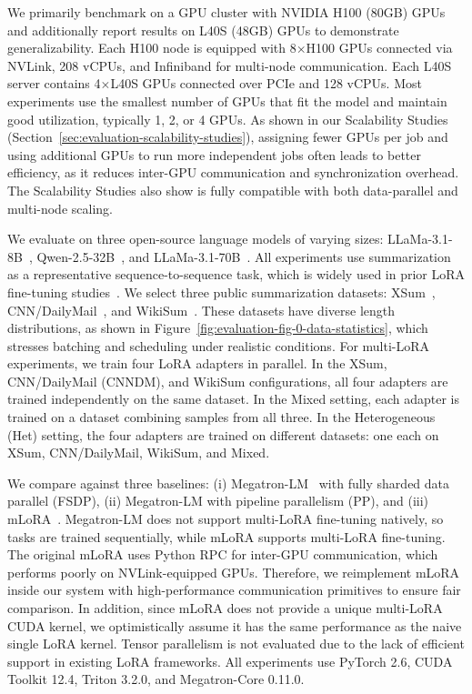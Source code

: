 We primarily benchmark \Name on a GPU cluster with NVIDIA H100 (80GB) GPUs and additionally report results on L40S (48GB) GPUs to demonstrate generalizability.
Each H100 node is equipped with 8$\times$H100 GPUs connected via NVLink, 208 vCPUs, and Infiniband for multi-node communication. 
Each L40S server contains 4$\times$L40S GPUs connected over PCIe and 128 vCPUs. 
Most experiments use the smallest number of GPUs that fit the model and maintain good utilization, typically 1, 2, or 4 GPUs. 
As shown in our Scalability Studies (Section~\ref{sec:evaluation-scalability-studies}), assigning fewer GPUs per job and using additional GPUs to run more independent jobs often leads to better efficiency, as it reduces inter-GPU communication and synchronization overhead.
The Scalability Studies also show \Name is fully compatible with both data-parallel and multi-node scaling.

We evaluate \Name on three open-source language models of varying sizes: LLaMa-3.1-8B~\cite{llama3.1}, Qwen-2.5-32B~\cite{yang2024qwen2-5}, and LLaMa-3.1-70B~\cite{llama3.1}. 
All experiments use summarization as a representative sequence-to-sequence task, which is widely used in prior LoRA fine-tuning studies~\cite{hu2022lora, li2023loftq, liu2024rst}.
We select three public summarization datasets: XSum~\cite{xsum-dataset}, CNN/DailyMail~\cite{cnn-dailymail-dataset}, and WikiSum~\cite{wikisum-dataset}. These datasets have diverse length distributions, as shown in Figure~\ref{fig:evaluation-fig-0-data-statistics}, which stresses batching and scheduling under realistic conditions.
For multi-LoRA experiments, we train four LoRA adapters in parallel. 
In the XSum, CNN/DailyMail (CNNDM), and WikiSum configurations, all four adapters are trained independently on the same dataset. In the Mixed setting, each adapter is trained on a dataset combining samples from all three. In the Heterogeneous (Het) setting, the four adapters are trained on different datasets: one each on XSum, CNN/DailyMail, WikiSum, and Mixed.

We compare \Name against three baselines: (i) Megatron-LM~\cite{megatron-1} with fully sharded data parallel (FSDP), (ii) Megatron-LM with pipeline parallelism (PP), and (iii) mLoRA~\cite{ye2023mlora}. 
Megatron-LM does not support multi-LoRA fine-tuning natively, so tasks are trained sequentially, while mLoRA supports multi-LoRA fine-tuning.
The original mLoRA uses Python RPC for inter-GPU communication, which performs poorly on NVLink-equipped GPUs. 
Therefore, we reimplement mLoRA inside our system with high-performance communication primitives to ensure fair comparison.
In addition, since mLoRA does not provide a unique multi-LoRA CUDA kernel, we optimistically assume it has the same performance as the naive single LoRA kernel.
Tensor parallelism is not evaluated due to the lack of efficient support in existing LoRA frameworks. 
All experiments use PyTorch 2.6, CUDA Toolkit 12.4, Triton 3.2.0, and Megatron-Core 0.11.0.

